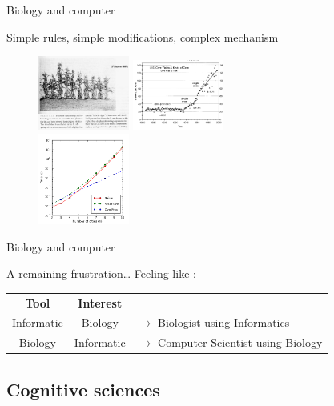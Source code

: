 \documentclass[8pt, handout=show,notes=show]{beamer}
\begin{document}
\begin{frame}{Biology and computer}

    Simple rules, simple modifications, complex mechanism\\
    \begin{figure}
	\includegraphics[width=3cm]{images/hybrid.png}\hspace{.3cm}
	\includegraphics[width=3cm]{images/maize.png} \\
	\includegraphics[width=3cm]{images/tsp.png}
    \end{figure}
    
\end{frame}

\begin{frame}{Biology and computer}
    \begin{alertblock}	{ A remaining frustration\ldots} 
	\vfill
	Feeling like :
	\vfill
	\begin{table}
	    \centering
	    \begin{tabular}{c|cl}
		\textbf{Tool} & \textbf{Interest} & \\\cline{1-2}
		Informatic & Biology &  $\rightarrow$ Biologist using Informatics  \\
		Biology & Informatic& $\rightarrow$ Computer Scientist using Biology\\
	    \end{tabular}
	\end{table}
    \end{alertblock}
\end{frame}

\subsection{Cognitive sciences}
\end{document}
